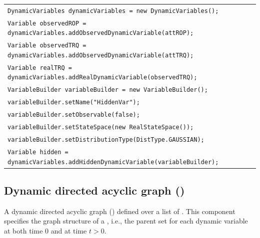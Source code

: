 \begin{table}[H]
\begin{tabular}{l} \\\hline

        \texttt{DynamicVariables dynamicVariables = new DynamicVariables();}\\

        \texttt{Variable observedROP = dynamicVariables.addObservedDynamicVariable(attROP);}\\
        \texttt{Variable observedTRQ = dynamicVariables.addObservedDynamicVariable(attTRQ);}\\
        \texttt{Variable realTRQ = dynamicVariables.addRealDynamicVariable(observedTRQ);}\\

        \texttt{VariableBuilder variableBuilder = new VariableBuilder();}\\
        \texttt{variableBuilder.setName("HiddenVar");}\\
        \texttt{variableBuilder.setObservable(false);}\\
        \texttt{variableBuilder.setStateSpace(new RealStateSpace()); }\\
        \texttt{variableBuilder.setDistributionType(DistType.GAUSSIAN);}\\
        \texttt{Variable hidden = dynamicVariables.addHiddenDynamicVariable(variableBuilder);}\\ \hline 

\end{tabular}
\end{table}

\subsection{Dynamic directed acyclic graph ()}

A dynamic directed acyclic graph () defined over a list of . This component specifies the graph structure of a , i.e., the parent set for each dynamic variable at both time $0$ and at time $t > 0$. 

